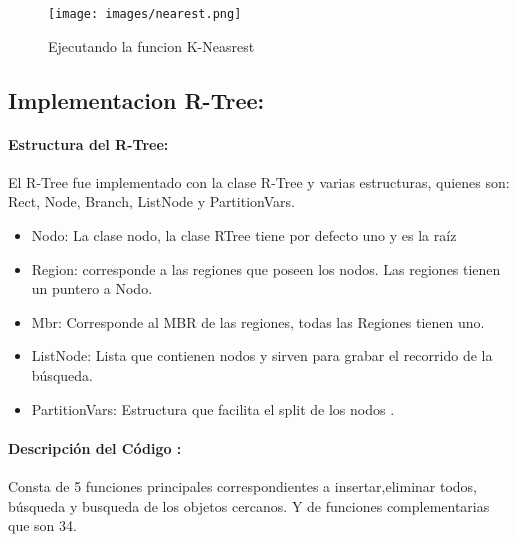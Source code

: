 \documentclass[12pt]{article}
\begin{document}
\newpage
\begin{figure}
\centering
\texttt{[image: images/nearest.png]}
\centering
\caption{Ejecutando la funcion K-Neasrest}
\end{figure}



\subsection*{Implementacion R-Tree: } 
\paragraph{ Estructura del R-Tree: } El R-Tree fue implementado con la clase R-Tree y varias estructuras, quienes son: Rect, Node, Branch, ListNode y PartitionVars.\\
\begin{itemize}
\item Nodo: La clase nodo, la clase RTree tiene por defecto uno y es la raíz\\
\item Region: corresponde a las regiones que poseen los nodos. Las regiones tienen un puntero a Nodo.\\
\item Mbr: Corresponde al MBR de las regiones, todas las Regiones tienen uno.\\
\item ListNode: Lista que contienen nodos y sirven para grabar el recorrido de la búsqueda.\\
\item PartitionVars:  Estructura que facilita el split de los nodos .
\end{itemize}
\paragraph{Descripción del Código :} Consta de 5 funciones principales correspondientes a insertar,eliminar todos, búsqueda y busqueda de los objetos cercanos. Y de funciones complementarias que son 34.

\end{document}
